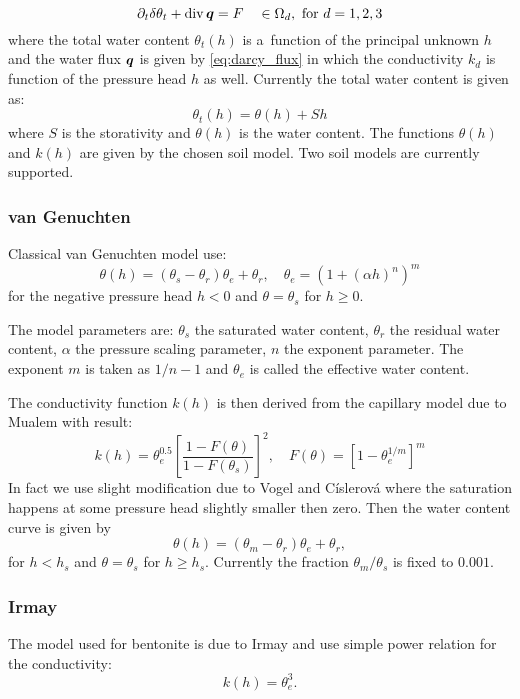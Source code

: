 \begin{equation}
 \partial_t \delta \theta_t + \operatorname{div} \mathbf{\boldsymbol{q}} = F\quad \in\Omega_d, \text{ for } d=1,2,3
\end{equation}
where the total water content $\theta_t(h)$ \units{}{}{} is a~function of the principal unknown $h$ and the water flux $\mathbf{\boldsymbol{q}}$ is given by \eqref{eq:darcy_flux} 
in which the conductivity $k_d$ is function of the pressure head $h$ as well.
Currently the total water content is given as:
\begin{equation}
    \theta_t(h) = \theta(h) + Sh
\end{equation}
where $S$ is the storativity and $\theta(h)$ is the water content. The functions $\theta(h)$ and $k(h)$ are given by the chosen soil model.
Two soil models are currently supported.

\subsubsection{van Genuchten}
Classical van Genuchten model use:
\[
    \theta(h) = (\theta_s-\theta_r)\theta_e + \theta_r,\quad \theta_e = (1+ (\alpha h)^n)^m
\]
for the negative pressure head $h<0$ and $\theta = \theta_s$ for $h\ge 0$.

The model parameters are:
    $\theta_s$ \units{}{}{} the saturated water content,
    $\theta_r$ \units{}{}{} the residual water content,
    $\alpha$  the pressure scaling parameter,
    $n$ \units{}{}{} the exponent parameter.
The exponent $m$ is taken as $1/n-1$ and $\theta_e$ \units{}{}{} is called the effective water content.

The conductivity function $k(h)$ is then derived from the capillary model due to Mualem with result:
\[
    k(h) = \theta_e^{0.5} \left[ \frac{1-F(\theta)}{1-F(\theta_s)} \right]^2,\quad F(\theta)= \left[ 1- \theta_e^{1/m} \right]^m
\]
In fact we use slight modification due to Vogel and Císlerová where the saturation happens at some pressure head slightly smaller then zero.
Then the water content curve is given by 
\[
    \theta(h) = (\theta_m-\theta_r)\theta_e + \theta_r,
\]
for $h< h_s$ and $\theta = \theta_s$ for $h\ge h_s$. Currently the fraction $\theta_m / \theta_s$ is fixed to $0.001$.

\subsubsection{Irmay}
The model used for bentonite is due to Irmay and use simple power relation for the conductivity:
\[
   k(h) = \theta_e^{3}.
\]



    

